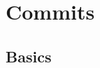 \documentclass{beamer}
\begin{document}
\begin{frame}
\begin{columns}
\begin{column}{0.5\textwidth}
\begin{center}
        
      \end{center}
    \end{column}
  \end{columns}
\end{frame}

\section{Commits}

\subsection{Basics}
\end{document}
